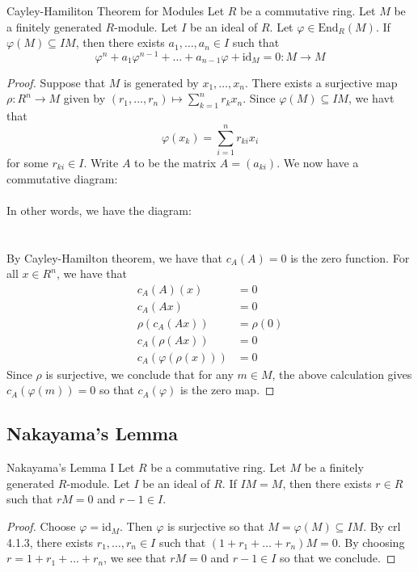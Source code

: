 \documentclass[a4paper]{article}
\begin{document}
\begin{thm}{Cayley-Hamiliton Theorem for Modules}{} Let $R$ be a commutative ring. Let $M$ be a finitely generated $R$-module. Let $I$ be an ideal of $R$. Let $\varphi\in\text{End}_R(M)$. If $\varphi(M)\subseteq IM$, then there exists $a_1,\dots,a_n\in I$ such that $$\varphi^n+a_1\varphi^{n-1}+\dots+a_{n-1}\varphi+\text{id}_M=0:M\to M$$ \tcbline
\begin{proof}
Suppose that $M$ is generated by $x_1,\dots,x_n$. There exists a surjective map $\rho:R^n\to M$ given by $(r_1,\dots,r_n)\mapsto\sum_{k=1}^nr_kx_n$. Since $\varphi(M)\subseteq IM$, we havt that $$\varphi(x_k)=\sum_{i=1}^nr_{ki}x_i$$ for some $r_{ki}\in I$. Write $A$ to be the matrix $A=(a_{ki})$. We now have a commutative diagram: \\~\\
In other words, we have the diagram: \\
\\~\\
By Cayley-Hamilton theorem, we have that $c_A(A)=0$ is the zero function. For all $x\in R^n$, we have that 
\begin{align*}
c_A(A)(x)&=0\\
c_A(Ax)&=0\\
\rho(c_A(Ax))&=\rho(0)\\
c_A(\rho(Ax))&=0\tag{$\rho$ is $R$-linear}\\
c_A(\varphi(\rho(x)))&=0\tag{Diagram is commutative}
\end{align*}
Since $\rho$ is surjective, we conclude that for any $m\in M$, the above calculation gives $c_A(\varphi(m))=0$ so that $c_A(\varphi)$ is the zero map. 
\end{proof}
\end{thm}

\subsection{Nakayama's Lemma}
\begin{lmm}{Nakayama's Lemma I}{} Let $R$ be a commutative ring. Let $M$ be a finitely generated $R$-module. Let $I$ be an ideal of $R$. If $IM=M$, then there exists $r\in R$ such that $rM=0$ and $r-1\in I$. \tcbline
\begin{proof}
Choose $\varphi=\text{id}_M$. Then $\varphi$ is surjective so that $M=\varphi(M)\subseteq IM$. By crl 4.1.3, there exists $r_1,\dots,r_n\in I$ such that $(1+r_1+\dots+r_n)M=0$. By choosing $r=1+r_1+\dots+r_n$, we see that $rM=0$ and $r-1\in I$ so that we conclude. 
\end{proof}
\end{lmm}
\end{document}

